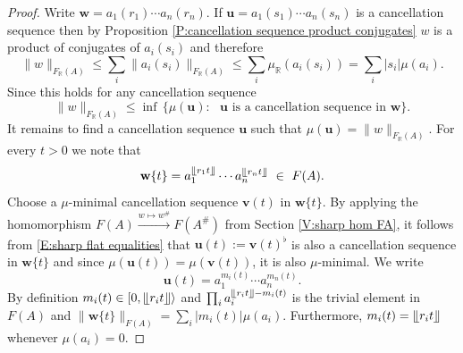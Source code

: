 \documentclass[12pt]{amsart}
\theoremstyle{definition}
\def\RR{\ensuremath{\mathbb{R}}}
\newcommand{\B}[1]{\mathbf{#1}}
\newcommand{\xto}[1]{\xrightarrow{#1}}
\newcommand{\trc}[1]{\{ #1 \}}   %
\def\Free{F}
\newcommand{\myfloor}[1]{\llfloor #1 \rrfloor}
\newcommand{\myinterval}[1]{[ #1 \rangle}
\begin{document}
\begin{proof}
Write $\B w=a_1(r_1) \cdots a_n(r_n)$.
If $\B u=a_1(s_1) \cdots a_n(s_n)$ is a cancellation sequence then by Proposition \ref{P:cancellation sequence product conjugates} $w$ is a product of conjugates of $a_i(s_i)$ and therefore
\[
\|w\|_{\Free_\RR(A)} \leq \sum_i \|a_i(s_i)\|_{\Free_\RR(A)} \leq \sum_i \mu_\RR(a_i(s_i)) = \sum_i |s_i| \mu(a_i).
\]
Since this holds for any cancellation sequence
\[
\| w\|_{\Free_\RR(A)} \leq \inf \, \{ \mu(\B u) : \text{ $\B u$ is a cancellation sequence in $\B w$}\}.
\]
It remains to find a cancellation sequence $\B u$ such that $\mu(\B u)=\|w\|_{\Free_\RR(A)}$.
For every $t>0$ we note that 
\[
\B w\trc{t} = a_1^{\myfloor{r_1t}} \cdots a_n^{\myfloor{r_nt}} \ \in \ \Free(A).
\]
Choose a $\mu$-minimal cancellation sequence $\B v(t)$ in $\B w\trc{t}$.
By applying the homomorphism $\Free(A) \xto{w \mapsto w^\#} \Free(A^\#)$ from Section \ref{V:sharp hom FA}, it follows from \eqref{E:sharp flat equalities} that $\B u(t) := \B v(t)^\flat$ is also a cancellation sequence in $\B w\trc{t}$ and since $\mu(\B u(t))=\mu(\B v(t))$, it is also $\mu$-minimal.
We write 
\[
\B u(t) = a_1^{m_i(t)} \cdots a_n^{m_n(t)}.
\]
By definition $m_i(t) \in \myinterval{0,\myfloor{r_it}}$ and $\prod_i a_i^{\myfloor{r_it}-m_i(t)}$ is the trivial element in $\Free(A)$ and  $\| \B w\trc{t}\|_{\Free(A)} = \sum_i |m_i(t)| \mu(a_i)$.
Furthermore, $m_i(t)=\myfloor{r_i t}$ whenever $\mu(a_i)=0$.


\end{proof}
\end{document}
